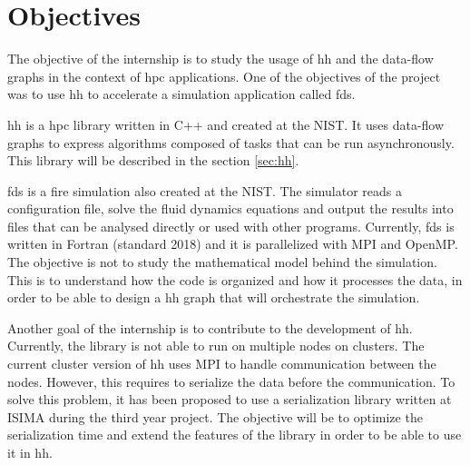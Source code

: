 
\clearpage
\section{Objectives}

The objective of the internship is to study the usage of \gls{hh} and the
data-flow graphs in the context of \gls{hpc} applications. One of the objectives
of the project was to use \gls{hh} to accelerate a simulation application called
\gls{fds}.

\gls{hh} is a \gls{hpc} library written in C++ and created at the NIST. It uses
data-flow graphs to express algorithms composed of tasks that can be run
asynchronously. This library will be described in the section \ref{sec:hh}.

\gls{fds} is a fire simulation also created at the NIST. The simulator reads a
configuration file, solve the fluid dynamics equations and output the results
into files that can be analysed directly or used with other programs. Currently,
\gls{fds} is written in Fortran (standard 2018) and it is parallelized with MPI
and OpenMP. The objective is not to study the mathematical model behind the
simulation. This is to understand how the code is organized and how it processes
the data, in order to be able to design a \gls{hh} graph that will orchestrate
the simulation.

Another goal of the internship is to contribute to the development of \gls{hh}.
Currently, the library is not able to run on multiple nodes on clusters. The
current cluster version of \gls{hh} uses MPI to handle communication between the
nodes. However, this requires to serialize the data before the communication. To
solve this problem, it has been proposed to use a serialization library written
at ISIMA during the third year project. The objective will be to optimize the
serialization time and extend the features of the library in order to be able to
use it in \gls{hh}.
